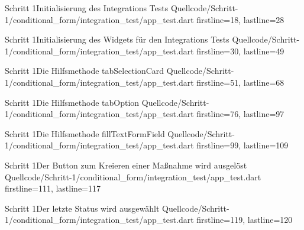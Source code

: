 \begin{alexlistingzwei}{Schritt 1}{Initialisierung des Integrations Tests}
  {Quellcode/Schritt-1/conditional_form/integration_test/app_test.dart}
  {firstline=18, lastline=28}
  \label{lst:Schritt1IntegrationsTestInitialisierung}
\end{alexlistingzwei}


\begin{alexlistingzwei}{Schritt 1}{Initialisierung des Widgets für den Integrations Tests}
  {Quellcode/Schritt-1/conditional_form/integration_test/app_test.dart}
  {firstline=30, lastline=49}
  \label{lst:Schritt1IntegrationsTestWidgetInitialisierung}
\end{alexlistingzwei}

\begin{alexlistingzwei}{Schritt 1}{Die Hilfsmethode tabSelectionCard}
  {Quellcode/Schritt-1/conditional_form/integration_test/app_test.dart}
  {firstline=51, lastline=68}
  \label{lst:Schritt1HilfsmethodeTabSelectionCard}
\end{alexlistingzwei}



\begin{alexlistingzwei}{Schritt 1}{Die Hilfsmethode tabOption}
  {Quellcode/Schritt-1/conditional_form/integration_test/app_test.dart}
  {firstline=76, lastline=97}
  \label{lst:Schritt1HilfsmethodeTabOption}
\end{alexlistingzwei}



\begin{alexlistingzwei}{Schritt 1}{Die Hilfsmethode fillTextFormField}
  {Quellcode/Schritt-1/conditional_form/integration_test/app_test.dart}
  {firstline=99, lastline=109}
  \label{lst:Schritt1HilfsmethodeFillTextFormField}
\end{alexlistingzwei}




\begin{alexlistingzwei}{Schritt 1}{Der Button zum Kreieren einer Maßnahme wird ausgelöst}
  {Quellcode/Schritt-1/conditional_form/integration_test/app_test.dart}
  {firstline=111, lastline=117}
  \label{lst:Schritt1ButtonKreierenMaßnahmeAusgeloest}
\end{alexlistingzwei}

\begin{alexlistingzwei}{Schritt 1}{Der letzte Status wird ausgewählt}
  {Quellcode/Schritt-1/conditional_form/integration_test/app_test.dart}
  {firstline=119, lastline=120}
  \label{lst:Schritt1LetzterStatusWirdAusgewählt}
\end{alexlistingzwei}


